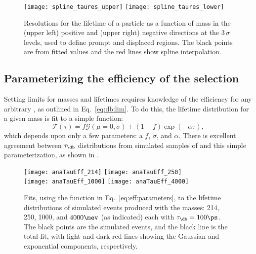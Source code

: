\begin{figure}
  \begin{center}
    \texttt{[image: spline\_taures\_upper]}
    \texttt{[image: spline\_taures\_lower]}\\
    \caption[Parameterization of lifetime resolution as a function of \db mass]
    {
      Resolutions for the lifetime of a particle as a function of mass in the
      (upper left) positive and
      (upper right) negative directions at the $3\,\sigma$ levels, used to
      define prompt and displaced regions.
      The black points are from fitted values and the red lines show spline interpolation.
    }
    \label{fig:eff:res}
  \end{center}
\end{figure}



\subsection{Parameterizing the efficiency of the \db selection}
Setting limits for \db masses and lifetimes requires knowledge of the efficiency for any arbitrary
\db, as outlined in Eq.~\ref{eq:db:lim}.
To do this, the lifetime distribution for a given mass is fit to a simple function:
\begin{equation}
  \mathcal{T}(\tau) = f\mathcal{G}(\mu=0, \sigma) + (1-f)\exp\left(-\alpha\tau\right),
  \label{eq:eff:parameters}
\end{equation}
which depends upon only a few parameters: a $f$, $\sigma$, and $\alpha$.
There is excellent agreement between $\tau_\db$ distributions from simulated samples of \btokstrdb
and this simple parameterization, as shown in .

\begin{figure}
  \begin{center}
    \texttt{[image: anaTauEff\_214]}
    \texttt{[image: anaTauEff\_250]}\\
    \texttt{[image: anaTauEff\_1000]}
    \texttt{[image: anaTauEff\_4000]}
    \caption{\small
      Fits, using the function in Eq.~\protect\ref{eq:eff:parameters},
      to the lifetime distributions of simulated events produced with the masses:
      214, 250, 1000, and $4000\mev$ (as indicated)
      each with $\tau_\db=100\ps$.
      The black points are the simulated events, and the black line is the total fit, with light
      and dark red lines showing the Gaussian and exponential components, respectively.
    }
    \label{fig:eff:fits}
  \end{center}
\end{figure}

